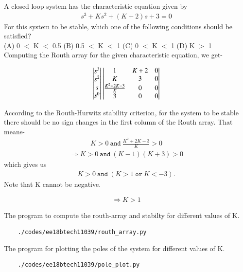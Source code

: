 A closed loop system has the characteristic equation given by \begin{align} s^3+Ks^2+(K+2)s+3 = 0 \end{align}For this system to be stable, which one of the following conditions should be satisfied? \\
(A) 0 \(<\) K \(<\) 0.5 
(B) 0.5 \(<\) K \(<\) 1 
(C) 0 \(<\) K \(<\) 1 
(D) K \(>\) 1 \\

\solution
Computing the Routh array for the given characteristic equation, we get-

\begin{align}
    \begin{vmatrix}s^3 \\ s^2 \\ s \\ s^0\end{vmatrix} 
    \begin{vmatrix}1 & K+2 & 0 \\ K & 3 & 0 \\ \frac{K^2+2K-3}{K} & 0 & 0 \\ 3 & 0 & 0\end{vmatrix}
\end{align}

According to the Routh-Hurwitz stability criterion, for the system to be stable there should be no sign changes in the first column of the Routh array. That means-
\begin{align}
    K > 0 \ \texttt{and} \ \frac{K^2+2K-3}{K} > 0 
\end{align}
\begin{align}
\Rightarrow K > 0 \ \texttt{and} \ (K-1)(K+3) > 0 
\end{align}
which gives us 
\begin{align}
    K > 0 \ \texttt{and} \ (K > 1 \ \texttt{or} \ K < -3).
\end{align}
Note that K cannot be negative.

\begin{align}
\Rightarrow K > 1 
\end{align}

The program to compute the routh-array and stabilty for different values of K.
\begin{lstlisting}
    ./codes/ee18btech11039/routh_array.py
\end{lstlisting}

The program for plotting the poles of the system for different values of K.
\begin{lstlisting}
    ./codes/ee18btech11039/pole_plot.py
\end{lstlisting}

